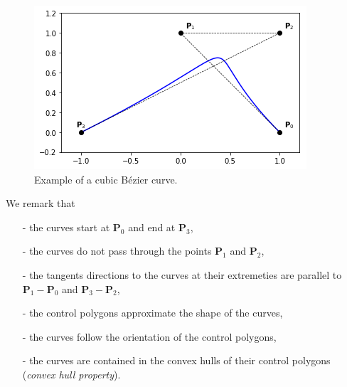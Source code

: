 \begin{description}
  \begin{figure}
  \centering
  \includegraphics[width=.6\textwidth]{figures/cad/bezier/ex3c}
  \caption{Example of a cubic B\'ezier curve.}
  \label{fig:bezier-ex3c}
  \end{figure}

  We remark that
  \begin{itemize}
    \item[-] the curves start at $\mathbf{P}_{0}$ and end at $\mathbf{P}_{3}$,
    \item[-] the curves do not pass through the points $\mathbf{P}_{1}$ and $\mathbf{P}_{2}$,
    \item[-] the tangents directions to the curves at their extremeties are parallel to $\mathbf{P}_{1} - \mathbf{P}_{0}$ and $\mathbf{P}_{3} - \mathbf{P}_{2}$,
    \item[-] the control polygons approximate the shape of the curves,
    \item[-] the curves follow the orientation of the control polygons,
    \item[-] the curves are contained in the convex hulls of their control polygons (\textit{convex hull property}).
  \end{itemize}

\end{description}




